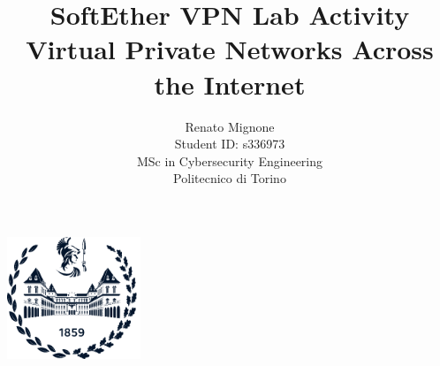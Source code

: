 \documentclass[a4paper,12pt]{article}
\title{SoftEther VPN Lab Activity\\
\large Virtual Private Networks Across the Internet}
\author{Renato Mignone\\
\small Student ID: s336973\\
\small MSc in Cybersecurity Engineering\\
\small Politecnico di Torino}
\begin{document}
\maketitle
\thispagestyle{empty}

\vfill
\begin{center}
\includegraphics[width=0.3\textwidth]{../resources/General/polito_logo.png}
\end{center}

\newpage



\newpage

\tableofcontents
\newpage











% 
% 
\end{document}
